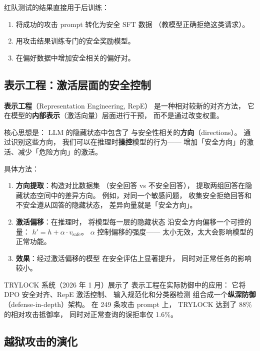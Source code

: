 红队测试的结果直接用于后训练：
\begin{enumerate}[noitemsep]
  \item 将成功的攻击 prompt 转化为安全 SFT 数据
       （教模型正确拒绝这类请求）。
  \item 用攻击结果训练专门的安全奖励模型。
  \item 在偏好数据中增加安全相关的偏好对。
\end{enumerate}

\subsection{表示工程：激活层面的安全控制}


\textbf{表示工程}（Representation Engineering, RepE）
是一种相对较新的对齐方法，
它在模型的\textbf{内部表示}（激活向量）层面进行干预，
而不是通过改变权重。

核心思想是：
LLM 的隐藏状态中包含了
与安全性相关的\textbf{方向}（directions）。
通过识别这些方向，
我们可以在推理时\textbf{操控}模型的行为——
增加「安全方向」的激活、减少「危险方向」的激活。

具体方法：
\begin{enumerate}[noitemsep]
  \item \textbf{方向提取}：构造对比数据集
       （安全回答 vs 不安全回答），
        提取两组回答在隐藏状态空间中的差异方向。
        例如，对同一个敏感问题，
        收集安全拒绝回答和不安全遵从回答的隐藏状态，
        差异向量就是「安全方向」。
  \item \textbf{激活偏移}：在推理时，
        将模型每一层的隐藏状态
        沿安全方向偏移一个可控的量：
        $h' = h + \alpha \cdot v_{\text{safe}}$。
        $\alpha$ 控制偏移的强度——
        太小无效，太大会影响模型的正常功能。
  \item \textbf{效果}：经过激活偏移的模型
        在安全评估上显著提升，
        同时对正常任务的影响较小。
\end{enumerate}

TRYLOCK 系统（2026 年 1 月）展示了
表示工程在实际防御中的应用：
它将 DPO 安全对齐、RepE 激活控制、
输入规范化和分类器检测
组合成一个\textbf{纵深防御}（defense-in-depth）架构。
在 249 条攻击 prompt 上，
TRYLOCK 达到了 88\% 的相对攻击抵御率，
同时对正常查询的误拒率仅 1.6\%。

\subsection{越狱攻击的演化}

